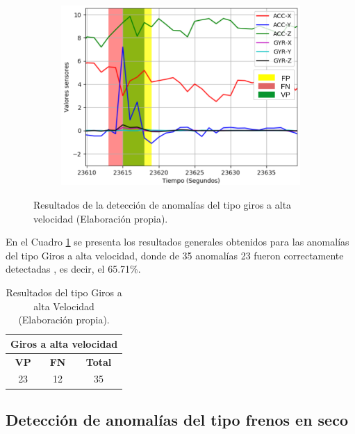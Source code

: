 \begin{figure}[H]
{\begin{varwidth}{\textwidth}
\begin{subfigure}[h]{0.45\textwidth}
            \includegraphics[width=\textwidth]{imagenes/Cap5/giro3}
        \end{subfigure} 
        \end{varwidth}}
        \caption{Resultados de la detecci\'{o}n de anomal\'{i}as del tipo giros a alta velocidad (Elaboraci\'{o}n propia).}
		\label{fig:resultados_giros}
    \end{figure}

En el Cuadro \ref{table:giros_resultado} se presenta los resultados generales obtenidos para las anomal\'{i}as del tipo Giros a alta velocidad, donde de 35 anomal\'{i}as 23 fueron correctamente detectadas , es decir, el 65.71\%.

\begin{table}[H]
\centering
\begin{center}
\begin{tabular}{|c|c|c|}
\hline
\multicolumn{3}{|l|}{\textbf{Giros a alta velocidad}} \\ \hline
\textbf{VP}   & \textbf{FN}   & \textbf{Total}  \\ \hline
\cellcolor[HTML]{AADD99}23  & \cellcolor[HTML]{DF9F9F}12  & 35             \\ \hline
\end{tabular}
\caption{Resultados del tipo Giros a alta Velocidad (Elaboraci\'{o}n propia).}
\label{table:giros_resultado}
\end{center}
\end{table}

\subsection{Detecci\'{o}n de anomal\'{i}as del tipo frenos en seco}

